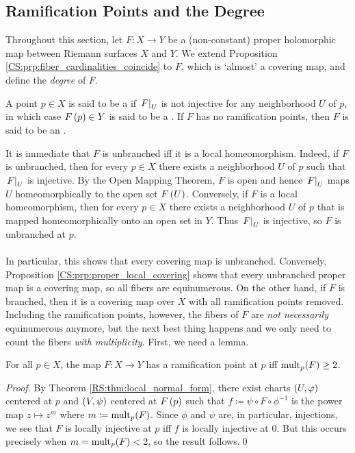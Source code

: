 \documentclass[../Moduli_Spaces_of_Riemann_Surfaces.tex]{subfiles}
\begin{document}
    \subsection{Ramification Points and the Degree}
    Throughout this section, let $F:X\to Y$ be a (non-constant) proper holomorphic map between Riemann surfaces $X$ and $Y$. We extend Proposition \ref{CS:prp:fiber_cardinalities_coincide} to $F$, which is `almost' a covering map, and define the \textit{degree} of $F$.
    \begin{definition}
        A point $p\in X$ is said to be a  if $\left.F\right|_U$ is not injective for any neighborhood $U$ of $p$, in which case $F\left(p\right)\in Y$ is said to be a . If $F$ has no ramification points, then $F$ is said to be an .
    \end{definition}
    \begin{remark}
        It is immediate that $F$ is unbranched iff it is a local homeomorphism. Indeed, if $F$ is unbranched, then for every $p\in X$ there exists a neighborhood $U$ of $p$ such that $\left.F\right|_U$ is injective. By the Open Mapping Theorem, $F$ is open and hence $\left.F\right|_U$ maps $U$ homeomorphically to the open set $F\left(U\right)$. Conversely, if $F$ is a local homeomorphism, then for every $p\in X$ there exists a neighborhood $U$ of $p$ that is mapped homeomorphically onto an open set in $Y$. Thus $\left.F\right|_U$ is injective, so $F$ is unbranched at $p$.\\\ \\
        In particular, this shows that every covering map is unbranched. Conversely, Proposition \ref{CS:prp:proper_local_covering} shows that every unbranched proper map is a covering map, so all fibers are equinumerous. On the other hand, if $F$ is branched, then it is a covering map over $X$ with all ramification points removed. Including the ramification points, however, the fibers of $F$ are \textit{not necessarily} equinumerous anymore, but the next best thing happens and we only need to count the fibers \textit{with multiplicity}. First, we need a lemma.\exqed
    \end{remark}
    \begin{lemma}\label{CS:lem:ramification_iff_mult_2}
        For all $p\in X$, the map $F:X\to Y$ has a ramification point at $p$ iff $\operatorname{mult}_p\!\left(F\right)\geq2$.
    \end{lemma}
    \begin{proof}
        By Theorem \ref{RS:thm:local_normal_form}, there exist charts $\left(U,\varphi\right)$ centered at $p$ and $\left(V,\psi\right)$ centered at $F\left(p\right)$ such that $f\coloneqq\psi\circ F\circ\phi^{-1}$ is the power map $z\mapsto z^m$ where $m\coloneqq\operatorname{mult}_p\!\left(F\right)$. Since $\phi$ and $\psi$ are, in particular, injections, we see that $F$ is locally injective at $p$ iff $f$ is locally injective at $0$. But this occurs precisely when $m=\operatorname{mult}_p\!\left(F\right)<2$, so the result follows.\qed
    \end{proof}
\end{document}
